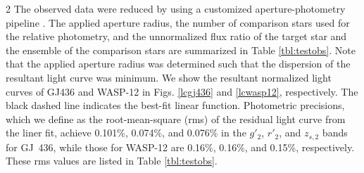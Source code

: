 \documentclass[a4paper,12pt]{spieman}  %
\begin{document}
\begin{spacing}{2}
The observed data were reduced by using a customized aperture-photometry pipeline \cite{2011PASJ...63..287F}.
The applied aperture radius, the number of comparison stars used for the relative photometry,
and the unnormalized flux ratio of the target star and the ensemble of the comparison stars are summarized
in Table \ref{tbl:testobs}.
Note that the applied aperture radius was determined such that
the dispersion of the resultant light curve was minimum.
We show the resultant normalized light curves of GJ436 and WASP-12 in
Figs. \ref{lcgj436} and \ref{lcwasp12}, respectively.
The black dashed line indicates the best-fit linear function.
Photometric precisions, which we define as the root-mean-square (rms)
of the residual light curve from the liner fit,
achieve 0.101\%, 0.074\%, and 0.076\% in the $g'_2$, $r'_2$, and $z_{s,2}$ bands for GJ~436,
while those for WASP-12 are 0.16\%, 0.16\%, and 0.15\%, respectively.
These rms values are listed in Table \ref{tbl:testobs}.





\end{spacing}
\end{document}
